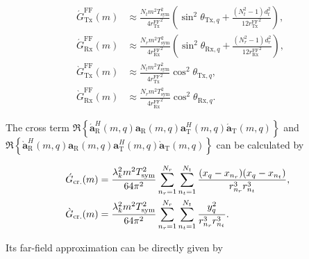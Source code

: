 \documentclass[9pt,final,journal,twocolumn]{IEEEtran}
\begin{document}
\begin{small}
\begin{subequations} \label{FF_gain_Tx_Rx_vx_vy}
 \begin{align} 
   \acute{G}_{\mathrm{Tx}}^{\mathrm{FF}}(m) & \approx \frac{N_t m^2 T_{\mathrm{sym}}^2}{4 {r_{\mathrm{Tx}}^{\mathrm{FF}}}^2}
\left(\sin^2\theta_{\mathrm{Tx},q} \!+\! \frac{(N_t^2-1)d_t^2}{12{r_{\mathrm{Tx}}^{\mathrm{FF}}}^2}
\right), \label{FF_approx_gain_Tx_vx}\\ 
   \acute{G}_{\mathrm{Rx}}^{\mathrm{FF}}(m) & \approx \frac{N_r m^2 T_{\mathrm{sym}}^2}{4 {r_{\mathrm{Rx}}^{\mathrm{FF}}}^2}
\left(\sin^2\theta_{\mathrm{Rx},q} \!+\! \frac{(N_r^2-1)d_r^2}{12{r_{\mathrm{Rx}}^{\mathrm{FF}}}^2}
\right), \label{FF_approx_gain_Rx_vx}\\
   \grave{G}_{\mathrm{Tx}}^{\mathrm{FF}}(m) & \approx \frac{N_t m^2 T_{\mathrm{sym}}^2}{4{r_{\mathrm{Tx}}^{\mathrm{FF}}}^2}
\cos^2\theta_{\mathrm{Tx},q}, \label{FF_approx_gain_Tx_vy}\\ 
   \grave{G}_{\mathrm{Rx}}^{\mathrm{FF}}(m) & \approx \frac{N_r m^2 T_{\mathrm{sym}}^2}{4{r_{\mathrm{Rx}}^{\mathrm{FF}}}^2}
\cos^2\theta_{\mathrm{Rx},q}. \label{FF_approx_gain_Rx_vy}
 \end{align}   
\end{subequations}
\end{small}
The cross term $\Re\!\left\{ 
\acute{\mathbf{a}}_{\mathrm{R}}^{H}(m,q)\mathbf{a}_{\mathrm{R}}(m,q)
\mathbf{a}_{\mathrm{T}}^{H}(m,q)\acute{\mathbf{a}}_{\mathrm{T}}(m,q)
\right\}$ and $\Re\!\left\{ 
\grave{\mathbf{a}}_{\mathrm{R}}^{H}(m,q)\mathbf{a}_{\mathrm{R}}(m,q)
\mathbf{a}_{\mathrm{T}}^{H}(m,q)\grave{\mathbf{a}}_{\mathrm{T}}(m,q)
\right\}$ can be calculated by
\begin{small}
\begin{subequations}
\begin{align}
&\hspace*{-0.5em}\acute{G}_{\mathrm{cr.}}(m)  = 
\frac{\lambda_k^2 m^2 T_{\mathrm{sym}}^2}{64\pi^2}
\sum_{n_r=1}^{N_r} \sum_{n_t=1}^{N_t}
\frac{(x_q - x_{n_r})(x_q - x_{n_t})}{r_{n_r}^3 r_{n_t}^3},\\
& \hspace*{-0.5em}\grave{G}_{\mathrm{cr.}}(m) = 
\frac{\lambda_k^2 m^2 T_{\mathrm{sym}}^2}{64\pi^2}
\sum_{n_r=1}^{N_r} \sum_{n_t=1}^{N_t}
\frac{y_q^2}{r_{n_r}^3 r_{n_t}^3}.
\end{align}
\end{subequations}
\end{small}
Its far-field approximation can be directly given by 
\end{document}
